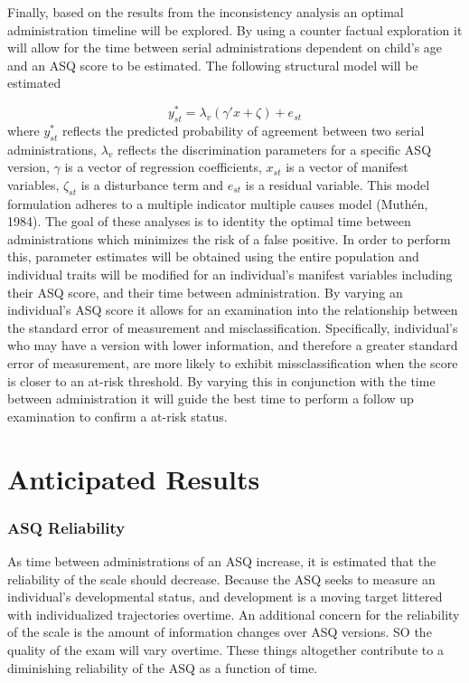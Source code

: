 \documentclass[
  11pt,
]{article}
\begin{document}
Finally, based on the results from the inconsistency analysis an optimal
administration timeline will be explored. By using a counter factual
exploration it will allow for the time between serial administrations
dependent on child's age and an ASQ score to be estimated. The following
structural model will be estimated

\[
y_{st}^*=\lambda_v (\gamma'x+\zeta) + e_{st}
\] where \(y_{st}^*\) reflects the predicted probability of agreement
between two serial administrations, \(\lambda_v\) reflects the
discrimination parameters for a specific ASQ version, \(\gamma\) is a
vector of regression coefficients, \(x_{st}\) is a vector of manifest
variables, \(\zeta_{st}\) is a disturbance term and \(e_{st}\) is a
residual variable. This model formulation adheres to a multiple
indicator multiple causes model (Muthén, 1984). The goal of these
analyses is to identity the optimal time between administrations which
minimizes the risk of a false positive. In order to perform this,
parameter estimates will be obtained using the entire population and
individual traits will be modified for an individual's manifest
variables including their ASQ score, and their time between
administration. By varying an individual's ASQ score it allows for an
examination into the relationship between the standard error of
measurement and misclassification. Specifically, individual's who may
have a version with lower information, and therefore a greater standard
error of measurement, are more likely to exhibit missclassification when
the score is closer to an at-risk threshold. By varying this in
conjunction with the time between administration it will guide the best
time to perform a follow up examination to confirm a at-risk status.

\hypertarget{anticipated-results}{%
\section{Anticipated Results}\label{anticipated-results}}

\hypertarget{asq-reliability-1}{%
\subsubsection{ASQ Reliability}\label{asq-reliability-1}}

As time between administrations of an ASQ increase, it is estimated that
the reliability of the scale should decrease. Because the ASQ seeks to
measure an individual's developmental status, and development is a
moving target littered with individualized trajectories overtime. An
additional concern for the reliability of the scale is the amount of
information changes over ASQ versions. SO the quality of the exam will
vary overtime. These things altogether contribute to a diminishing
reliability of the ASQ as a function of time.
\end{document}
